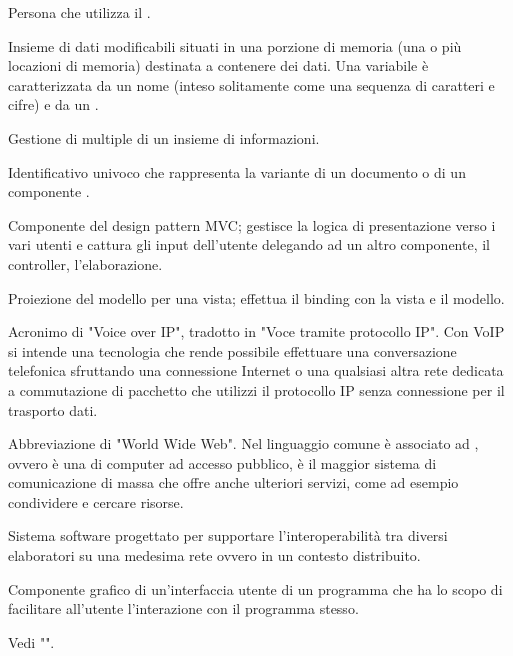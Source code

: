{Persona che utilizza il  .}




{Insieme di dati modificabili situati in una porzione di memoria (una o più locazioni di memoria) destinata a contenere dei dati. Una variabile è caratterizzata da un nome (inteso solitamente come una sequenza di caratteri e cifre) e da un .}

{Gestione di  multiple di un insieme di informazioni.}

{Identificativo univoco che rappresenta la variante di un documento o di un componente .}

{Componente del design pattern MVC; gestisce la logica di presentazione verso i vari utenti e cattura gli input dell'utente delegando ad un altro componente, il controller, l'elaborazione.}

{Proiezione del modello per una vista; effettua il binding con la vista e il modello.}

{Acronimo di "Voice over IP", tradotto in "Voce tramite protocollo IP". Con VoIP si intende una tecnologia che rende possibile effettuare una conversazione telefonica sfruttando una connessione Internet o una qualsiasi altra rete dedicata a commutazione di pacchetto che utilizzi il protocollo IP senza connessione per il trasporto dati.}




{Abbreviazione di "World Wide Web". Nel linguaggio comune è associato ad , ovvero è una  di computer ad accesso pubblico, è il maggior sistema di comunicazione di massa che offre anche ulteriori servizi, come ad esempio condividere e cercare risorse.}

{Sistema software progettato per supportare l'interoperabilità tra diversi elaboratori su una medesima rete ovvero in un contesto distribuito.}

{Componente grafico di un'interfaccia utente di un programma che ha lo scopo di facilitare all'utente l'interazione con il programma stesso.}

{Vedi "".}
